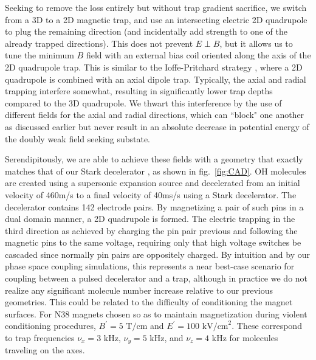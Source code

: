 \documentclass[%
 reprint,
 amsmath,amssymb,
 aps,
prl,
]{revtex4-1}
\begin{document}
Seeking to remove the loss entirely but without trap gradient sacrifice, we switch from a 3D to a 2D magnetic trap, and use an intersecting electric 2D quadrupole to plug the remaining direction (and incidentally add strength to one of the already trapped directions). This does not prevent $E\!\perp\! B$, but it allows us to tune the minimum $B$ field with an external bias coil oriented along the axis of the 2D quadrupole trap. This is similar to the Ioffe-Pritchard strategy \cite{pritchard1983}, where a 2D quadrupole is combined with an axial dipole trap. Typically, the axial and radial trapping interfere somewhat, resulting in significantly lower trap depths compared to the 3D quadrupole. We thwart this interference by the use of different fields for the axial and radial directions, which can ``block" one another as discussed earlier but never result in an absolute decrease in potential energy of the doubly weak field seeking substate. 

Serendipitously, we are able to achieve these fields with a geometry that exactly matches that of our Stark decelerator \cite{Bochinski2003}, as shown in fig.~\ref{fig:CAD}. OH molecules are created using a supersonic expansion source and decelerated from an initial velocity of 460m/s to a final velocity of 40ms/s using a Stark decelerator. The decelerator contains 142 electrode pairs. By magnetizing a pair of such pins in a dual domain manner, a 2D quadrupole is formed. The electric trapping in the third direction as achieved by charging the pin pair previous and following the magnetic pins to the same voltage, requiring only that high voltage switches be cascaded since normally pin pairs are oppositely charged. By intuition and by our phase space coupling simulations, this represents a near best-case scenario for coupling between a pulsed decelerator and a trap, although in practice we do not realize any significant molecule number increase relative to our previous geometries. This could be related to the difficulty of conditioning the magnet surfaces. For N38 magnets chosen so as to maintain magnetization during violent conditioning procedures, $B^\prime=5\text{ T/cm}$ and $E^\prime=100 \text{ kV/cm}^2$. These correspond to trap frequencies $\nu_x=3\text{ kHz}$, $\nu_y=5\text{ kHz}$, and $\nu_z=4\text{ kHz}$ for molecules traveling on the axes.
\end{document}
